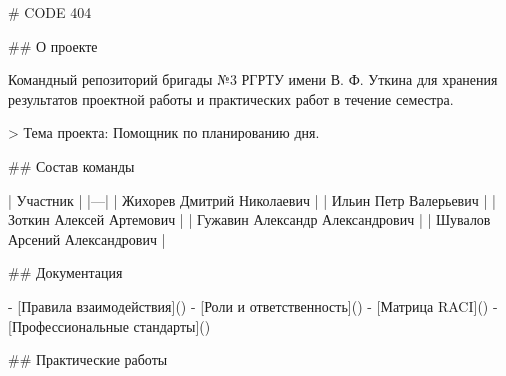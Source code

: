 # CODE 404

## О проекте 

Командный репозиторий бригады №3 РГРТУ имени В. Ф. Уткина для хранения результатов проектной работы и практических работ в течение семестра.

> Тема проекта: Помощник по планированию дня.

## Состав команды

| Участник |
|---|
| Жихорев Дмитрий Николаевич |
| Ильин Петр Валерьевич |
| Зоткин Алексей Артемович |
| Гужавин Александр Александрович |
| Шувалов Арсений Александрович |

## Документация

- [Правила взаимодействия]()
- [Роли и ответственность]()
- [Матрица RACI]()
- [Профессиональные стандарты]()

## Практические работы

